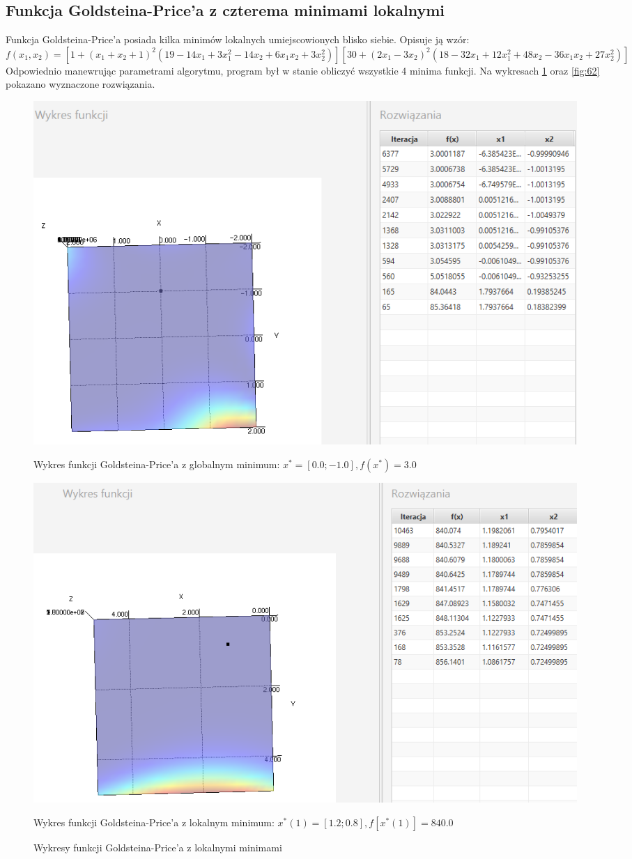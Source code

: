 \documentclass[10pt, a4paper]{article}
\begin{document}
\subsection{Funkcja Goldsteina-Price’a z czterema minimami lokalnymi}
\label{subsec:cenyzlota}
Funkcja Goldsteina-Price’a posiada kilka minimów lokalnych umiejscowionych blisko siebie. Opisuje ją wzór: $$f(x_{1},x_{2}) = [1+(x_{1}+x_{2}+1)^2(19-14x_{1}+3x_{1}^2-14x_{2}+6x_{1}x_{2}+3x_{2}^2)][30+(2x_{1}-3x_{2})^2(18-32x_{1}+12x_{1}^2+48x_{2}-36x_{1}x_{2}+27x_{2}^2)]$$ Odpowiednio manewrując parametrami algorytmu, program był w stanie obliczyć wszystkie 4 minima funkcji. Na wykresach \ref{fig:61} oraz \ref{fig:62} pokazano wyznaczone rozwiązania.
\begin{figure}[htbp] 
	\begin{minipage}[b]{1\textwidth}
		\centering
		\includegraphics[width=\linewidth]{images/goldprice0.PNG}
		\caption{Wykres funkcji Goldsteina-Price’a z globalnym minimum: $x^*=[0.0; -1.0], f(x^*)=3.0$ }
	\end{minipage} 
	\begin{minipage}[b]{1\textwidth}
		\centering
		\includegraphics[width=\linewidth]{images/goldprice1.PNG} 
		\caption{Wykres funkcji Goldsteina-Price’a z lokalnym minimum: $x^*(1)=[1.2; 0.8], f[x^*(1)] = 840.0$ }
	\end{minipage}
	\caption{Wykresy funkcji Goldsteina-Price’a z lokalnymi minimami }
	\label{fig:61}
\end{figure}
\end{document}
